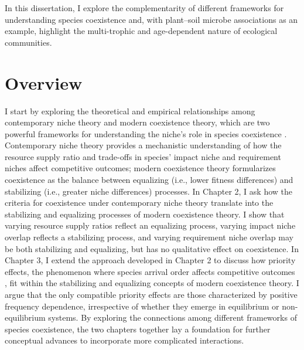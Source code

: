 In this dissertation, I explore the complementarity of different frameworks for understanding species coexistence and, with plant--soil microbe associations as an example, highlight the multi-trophic and age-dependent nature of ecological communities. 
\par



\section{Overview}
I start by exploring the theoretical and empirical relationships among contemporary niche theory and modern coexistence theory, which are two powerful frameworks for understanding the niche's role in species coexistence \citep{Chesson2000, Chase2003}. Contemporary niche theory provides a mechanistic understanding of how the resource supply ratio and trade-offs in species' impact niche and requirement niches affect competitive outcomes; modern coexistence theory formularizes coexistence as the balance between equalizing (i.e., lower fitness differences) and stabilizing (i.e., greater niche differences) processes. In Chapter 2, I ask how the criteria for coexistence under contemporary niche theory translate into the stabilizing and equalizing processes of modern coexistence theory. I show that varying resource supply ratios reflect an equalizing process, varying impact niche overlap reflects a stabilizing process, and varying requirement niche overlap may be both stabilizing and equalizing, but has no qualitative effect on coexistence.
In Chapter 3, I extend the approach developed in Chapter 2 to discuss how priority effects, the phenomenon where species arrival order affects competitive outcomes \citep{Fukami2015}, fit within the stabilizing and equalizing concepts of modern coexistence theory. I argue that the only compatible priority effects are those characterized by positive frequency dependence, irrespective of whether they emerge in equilibrium or non-equilibrium systems.
By exploring the connections among different frameworks of species coexistence, the two chapters together lay a foundation for further conceptual advances to incorporate more complicated interactions.
\par


